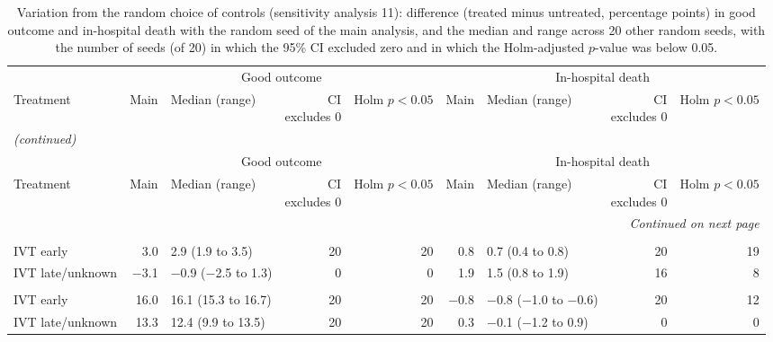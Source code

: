 {\footnotesize
\setlength{\tabcolsep}{2.5pt}
\begin{longtable}{p{4.3cm}rlrrrlrr}
\caption{Variation from the random choice of controls (sensitivity analysis 11): difference (treated minus untreated, percentage points) in good outcome and in-hospital death with the random seed of the main analysis, and the median and range across 20 other random seeds, with the number of seeds (of 20) in which the 95\% CI excluded zero and in which the Holm-adjusted $p$-value was below 0.05.}\label{tab:supp_seeds}\\
\toprule
& \multicolumn{4}{c}{Good outcome} & \multicolumn{4}{c}{In-hospital death} \\
\cmidrule(lr){2-5}\cmidrule(lr){6-9}
Treatment & Main & Median (range) & \makecell{CI\\excludes 0} & \makecell{Holm\\$p<0.05$} & Main & Median (range) & \makecell{CI\\excludes 0} & \makecell{Holm\\$p<0.05$} \\
\midrule
\endfirsthead
\multicolumn{9}{l}{\textit{(continued)}}\\
\toprule
& \multicolumn{4}{c}{Good outcome} & \multicolumn{4}{c}{In-hospital death} \\
\cmidrule(lr){2-5}\cmidrule(lr){6-9}
Treatment & Main & Median (range) & \makecell{CI\\excludes 0} & \makecell{Holm\\$p<0.05$} & Main & Median (range) & \makecell{CI\\excludes 0} & \makecell{Holm\\$p<0.05$} \\
\midrule
\endhead
\midrule
\multicolumn{9}{r}{\textit{Continued on next page}}\\
\endfoot
\bottomrule
\endlastfoot
\multicolumn{9}{l}{\textbf{NIHSS 1--5}}\\
IVT early & 3.0 & 2.9 (1.9 to 3.5) & 20 & 20 & 0.8 & 0.7 (0.4 to 0.8) & 20 & 19 \\
IVT late/unknown & $-$3.1 & $-$0.9 ($-$2.5 to 1.3) & 0 & 0 & 1.9 & 1.5 (0.8 to 1.9) & 16 & 8 \\
\addlinespace
\multicolumn{9}{l}{\textbf{NIHSS 6--10}}\\
IVT early & 16.0 & 16.1 (15.3 to 16.7) & 20 & 20 & $-$0.8 & $-$0.8 ($-$1.0 to $-$0.6) & 20 & 12 \\
IVT late/unknown & 13.3 & 12.4 (9.9 to 13.5) & 20 & 20 & 0.3 & $-$0.1 ($-$1.2 to 0.9) & 0 & 0 \\

\end{longtable}}
